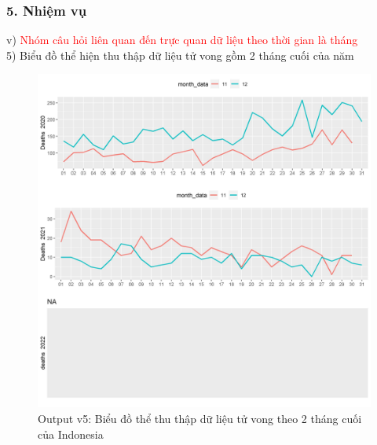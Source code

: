 \documentclass[english,10pt,table]{beamer}
\begin{document}
\begin{frame}[fragile]
\frametitle{5.  Nhiệm vụ}
v) \textcolor{red}{Nhóm câu hỏi liên quan đến trực quan dữ liệu theo thời gian là tháng}\\
    5) Biểu đồ thể hiện thu thập dữ liệu tử vong gồm 2 tháng cuối của năm
	\begin{figure}[h!]
	\begin{center}
		    \includegraphics[scale = 0.25]{Images/V/v5 Indonesia .jpeg}
		     \caption{Output v5: Biểu đồ thể thu thập dữ liệu tử vong theo 2 tháng cuối của Indonesia}
		\end{center}
		\end{figure}
\end{frame}
\end{document}
